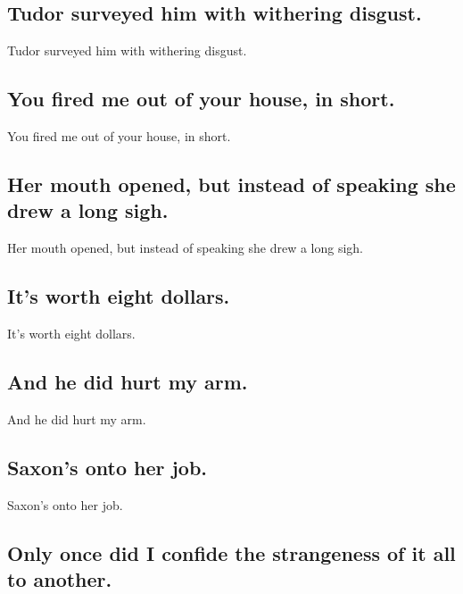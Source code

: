 \documentclass[]{article}
\begin{document}
\hypertarget{tudor-surveyed-him-with-withering-disgust.}{%
\subsection{Tudor surveyed him with withering
disgust.}\label{tudor-surveyed-him-with-withering-disgust.}}

Tudor surveyed him with withering disgust.

\hypertarget{you-fired-me-out-of-your-house-in-short.}{%
\subsection{You fired me out of your house, in
short.}\label{you-fired-me-out-of-your-house-in-short.}}

You fired me out of your house, in short.

\hypertarget{her-mouth-opened-but-instead-of-speaking-she-drew-a-long-sigh.}{%
\subsection{Her mouth opened, but instead of speaking she drew a long
sigh.}\label{her-mouth-opened-but-instead-of-speaking-she-drew-a-long-sigh.}}

Her mouth opened, but instead of speaking she drew a long sigh.

\hypertarget{its-worth-eight-dollars.}{%
\subsection{It's worth eight dollars.}\label{its-worth-eight-dollars.}}

It's worth eight dollars.

\hypertarget{and-he-did-hurt-my-arm.}{%
\subsection{And he did hurt my arm.}\label{and-he-did-hurt-my-arm.}}

And he did hurt my arm.

\hypertarget{saxons-onto-her-job.}{%
\subsection{Saxon's onto her job.}\label{saxons-onto-her-job.}}

Saxon's onto her job.

\hypertarget{only-once-did-i-confide-the-strangeness-of-it-all-to-another.}{%
\subsection{Only once did I confide the strangeness of it all to
another.}\label{only-once-did-i-confide-the-strangeness-of-it-all-to-another.}}
\end{document}
